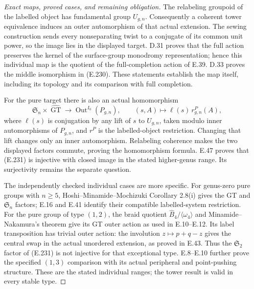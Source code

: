 \begin{proof}[Exact maps, proved cases, and remaining obligation]
The relabeling groupoid of the labelled object
has fundamental group $U_{g,n}$.
Consequently a coherent tower equivalence
induces an outer automorphism of that actual
extension.  The sewing construction sends
every nonseparating twist to a conjugate
of its common unit power, so the image
lies in the displayed target.  D.31 proves
that the full action preserves the kernel
of the surface-group monodromy representation;
hence this individual map is the quotient
of the full-completion action of E.39.
D.33 proves the middle isomorphism in
(E.230).  These statements establish the
map itself, including its topology and
its comparison with full completion.

For the pure target there is also an actual
homomorphism
\[
 \mathfrak S_n\times\widehat{\operatorname{GT}}
       \longrightarrow\operatorname{Out}^{I_0}(P_{g,n}),
 \qquad (s,A)\longmapsto\ell(s)\,r^P_{g,n}(A),             \tag{E.231}
\]
where $\ell(s)$ is conjugation by any lift
of $s$ to $U_{g,n}$, taken modulo inner
automorphisms of $P_{g,n}$, and $r^P$ is
the labelled-object restriction.
Changing that lift changes only an inner
automorphism.  Relabeling coherence makes
the two displayed factors commute, proving
the homomorphism formula. E.47 proves that
(E.231) is injective with closed image in
the stated higher-genus range. Its
surjectivity remains the separate question.

The independently checked individual cases
are more specific.  For genus-zero pure
groups with $n\geq5$, Hoshi--Minamide--Mochizuki
Corollary 2.8(i) gives the GT and
$\mathfrak S_n$ factors; E.16 and E.41
identify their compatible labelled-system
restriction.  For the pure group of type
$(1,2)$, the braid quotient
$\widehat B_4/\langle\omega_4\rangle$
and Minamide--Nakamura's theorem give its
GT outer action as used in E.10--E.12.
Its label transposition has trivial outer
action: the involution $z\mapsto p+q-z$
gives the central swap in the actual
unordered extension, as proved in E.43.
Thus the $\mathfrak S_2$ factor of (E.231)
is not injective for that exceptional type.
E.8--E.10 further prove the specified
$(1,3)$ comparison with its actual
peripheral and point-pushing structure.
These are the stated individual ranges;
the tower result is valid in every stable
type.


\end{proof}
